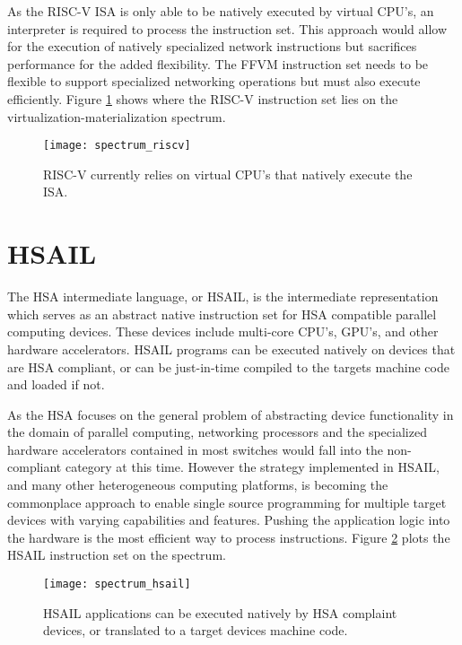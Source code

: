 As the RISC-V ISA is only able to be natively executed by virtual CPU's, an
interpreter is required to process the instruction set. This approach would
allow for the execution of natively specialized network instructions but
sacrifices performance for the added flexibility. The FFVM instruction set
needs to be flexible to support specialized networking operations but must also
execute efficiently. Figure \ref{spectrum_riscv} shows where the RISC-V
instruction set lies on the virtualization-materialization spectrum.

\begin{figure}[h!]
  \centering
  \texttt{[image: spectrum\_riscv]}
  \caption{RISC-V currently relies on virtual CPU's that natively execute the
  ISA.}
  \label{spectrum_riscv}
\end{figure}

\section{HSAIL}
\label{insn:hsail}
The HSA intermediate language, or HSAIL, is the intermediate representation
which serves as an abstract native instruction set for HSA compatible parallel
computing devices. These devices include multi-core CPU's, GPU's, and other
hardware accelerators. HSAIL programs can be executed natively on devices that
are HSA compliant, or can be just-in-time compiled to the targets machine code
and loaded if not.

As the HSA focuses on the general problem of abstracting device functionality
in the domain of parallel computing, networking processors and the specialized
hardware accelerators contained in most switches would fall into the
non-compliant category at this time. However the strategy implemented in HSAIL,
and many other heterogeneous computing platforms, is becoming the commonplace
approach to enable single source programming for multiple target devices with
varying capabilities and features. Pushing the application logic into the
hardware is the most efficient way to process instructions. Figure
\ref{spectrum_hsail} plots the HSAIL instruction set on the spectrum.

\begin{figure}[h!]
  \centering
  \texttt{[image: spectrum\_hsail]}
  \caption{HSAIL applications can be executed natively by HSA complaint devices,
  or translated to a target devices machine code.}
  \label{spectrum_hsail}
\end{figure}


